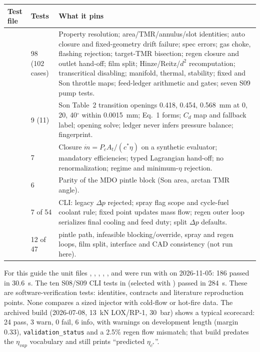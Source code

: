 {\small
\begin{longtable}{@{}P{4.0cm}P{1.5cm}P{10.7cm}@{}}
\toprule
\textbf{Test file} & \textbf{Tests} & \textbf{What it pins} \\
\midrule
\endhead
{} & 98 (102 cases) & Property resolution; area/TMR/annulus/slot identities; auto closure and fixed-geometry drift failure; spec errors; gas choke, flashing rejection; target-TMR bisection; regen closure and outlet hand-off; film split; Hinze/Reitz/$d^2$ recomputation; transcritical disabling; manifold, thermal, stability; fixed and Son throttle maps; feed-ledger arithmetic and gates; seven S09 pump tests. \\
 & 9 (11) & Son Table~2 transition openings 0.418, 0.454, 0.568~mm at 0, 20, 40$^\circ$ within 0.0015~mm; Eq.~1 forms; $C_d$ map and fallback label; opening solve; ledger never infers pressure balance; fingerprint. \\
 & 7 & Closure $\dot m=P_cA_t/(c^*\eta)$ on a synthetic evaluator; mandatory efficiencies; typed Lagrangian hand-off; no renormalization; regime and minimum-$\eta$ rejection. \\
 & 6 & Parity of the MDO pintle block (Son area, arctan TMR angle). \\
 & 7 of 54 & CLI: legacy $\Delta p$ rejected; spray flag scope and cycle-fuel coolant rule; fixed point updates mass flow; regen outer loop serializes final cooling and feed duty; split $\Delta p$ defaults. \\
 & 12 of 47 &  pintle path, infeasible blocking/override, spray and regen loops, film split, interface and CAD consistency (not run here). \\
\bottomrule
\end{longtable}}

For this guide the unit files , ,
, ,
,  and
 were run with  on 2026-11-05: 186 passed in
30.6~s. The ten S08/S09 CLI tests in  (selected with
) passed in 284~s. These are
software-verification tests: identities, contracts and literature reproduction
points. None compares a sized injector with cold-flow or hot-fire data. The
archived build  (2026-07-08,
13~kN LOX/RP-1, 30~bar) shows a typical scorecard: 24 pass, 3 warn, 0 fail,
6 info, with warnings on development length (margin 0.33),
\texttt{validation\_status} and a 2.5\% regen flow mismatch; that build predates
the $\eta_{vap}$ vocabulary and still prints ``predicted $\eta_{c^*}$''.

